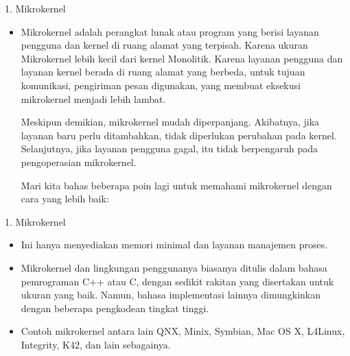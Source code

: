 \documentclass[aspectratio=169, table]{beamer}
\begin{document}
	
	
	\begin{frame}{1. Mikrokernel}
		\begin{itemize}
			
			\item Mikrokernel adalah perangkat lunak atau program yang berisi layanan pengguna dan kernel di ruang alamat yang terpisah. Karena ukuran Mikrokernel lebih kecil dari kernel Monolitik. Karena layanan pengguna dan layanan kernel berada di ruang alamat yang berbeda, untuk tujuan komunikasi, pengiriman pesan digunakan, yang membuat eksekusi mikrokernel menjadi lebih lambat.
			
			Meskipun demikian, mikrokernel mudah diperpanjang. Akibatnya, jika layanan baru perlu ditambahkan, tidak diperlukan perubahan pada kernel. Selanjutnya, jika layanan pengguna gagal, itu tidak berpengaruh pada pengoperasian mikrokernel.
			
			Mari kita bahas beberapa poin lagi untuk memahami mikrokernel dengan cara yang lebih baik: 
			
			
		
		\end{itemize}	
	\end{frame}
	
	\begin{frame}{1. Mikrokernel}
		\begin{itemize}
			
		
			
			
			\item Ini hanya menyediakan memori minimal dan layanan manajemen proses.
			
			\item Mikrokernel dan lingkungan penggunanya biasanya ditulis dalam bahasa pemrograman C++ atau C, dengan sedikit rakitan yang disertakan untuk ukuran yang baik. Namun, bahasa implementasi lainnya dimungkinkan dengan beberapa pengkodean tingkat tinggi.
			
			\item Contoh mikrokernel antara lain QNX, Minix, Symbian, Mac OS X, L4Linux, Integrity, K42, dan lain sebagainya.
		\end{itemize}	
	\end{frame}
	
\end{document}
